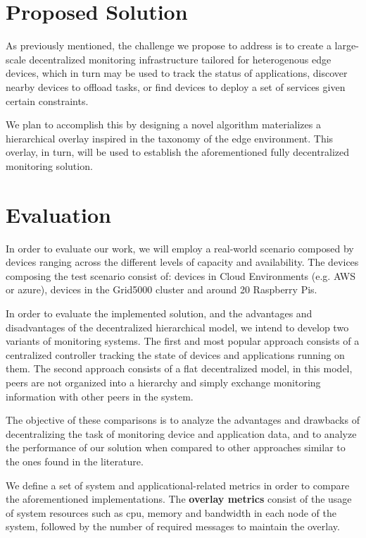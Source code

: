 \section{Proposed Solution}
\label{cha:proposed_sol}

As previously mentioned, the challenge we propose to address is to create a large-scale decentralized monitoring infrastructure tailored for heterogenous edge devices, which in turn may be used to track the status of applications, discover nearby devices to offload tasks, or find devices to deploy a set of services given certain constraints. 

We plan to accomplish this by designing a novel algorithm materializes a hierarchical overlay inspired in the taxonomy of the edge environment. This overlay, in turn, will be used to establish the aforementioned fully decentralized monitoring solution. 


\section{Evaluation}  

In order to evaluate our work, we will employ a real-world scenario composed by devices ranging across the different levels of capacity and availability. The devices composing the test scenario consist of: devices in Cloud Environments (e.g. AWS or azure), devices in the Grid5000 cluster and around 20 Raspberry Pis.

In order to evaluate the implemented solution, and the advantages and disadvantages of the decentralized hierarchical model, we intend to develop two variants of monitoring systems. The first and most popular approach consists of a centralized controller tracking the state of devices and applications running on them. The second approach consists of a flat decentralized model, in this model, peers are not organized into a hierarchy and simply exchange monitoring information with other peers in the system. 

The objective of these comparisons is to analyze the advantages and drawbacks of decentralizing the task of monitoring device and application data, and to analyze the performance of our solution when compared to other approaches similar to the ones found in the literature. 

We define a set of system and applicational-related metrics in order to compare the aforementioned implementations. The \textbf{overlay metrics} consist of the usage of system resources such as cpu, memory and bandwidth in each node of the system, followed by the number of required messages to maintain the overlay.

